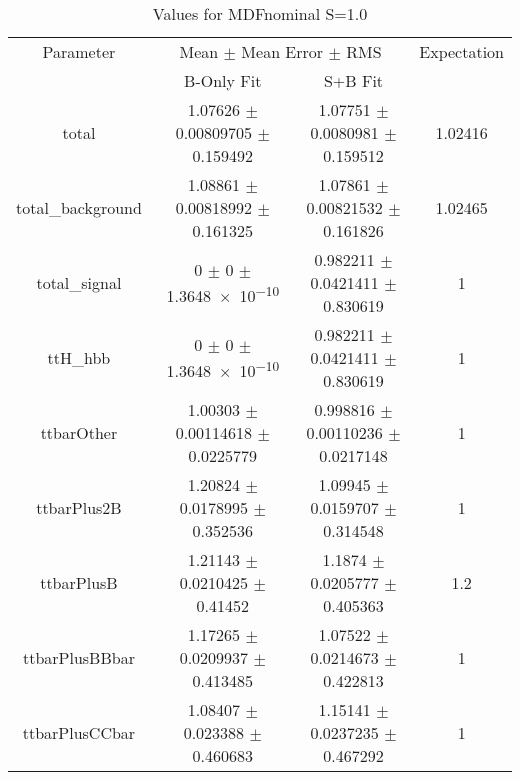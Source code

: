 \begin{table}
\centering
\caption{Values for MDFnominal S=1.0}
\begin{tabular}{cccc}
\toprule
Parameter & \multicolumn{2}{c}{Mean $\pm$ Mean Error $\pm$ RMS} & Expectation\\
 & B-Only Fit & S+B Fit & \\
\midrule
total & \num{1.07626} $\pm$ \num{0.00809705} $\pm$ \num{0.159492} & \num{1.07751} $\pm$ \num{0.0080981} $\pm$ \num{0.159512} & \num{1.02416}\\
total\_background & \num{1.08861} $\pm$ \num{0.00818992} $\pm$ \num{0.161325} & \num{1.07861} $\pm$ \num{0.00821532} $\pm$ \num{0.161826} & \num{1.02465}\\
total\_signal & \num{0} $\pm$ \num{0} $\pm$ \num{1.3648e-10} & \num{0.982211} $\pm$ \num{0.0421411} $\pm$ \num{0.830619} & \num{1}\\
ttH\_hbb & \num{0} $\pm$ \num{0} $\pm$ \num{1.3648e-10} & \num{0.982211} $\pm$ \num{0.0421411} $\pm$ \num{0.830619} & \num{1}\\
ttbarOther & \num{1.00303} $\pm$ \num{0.00114618} $\pm$ \num{0.0225779} & \num{0.998816} $\pm$ \num{0.00110236} $\pm$ \num{0.0217148} & \num{1}\\
ttbarPlus2B & \num{1.20824} $\pm$ \num{0.0178995} $\pm$ \num{0.352536} & \num{1.09945} $\pm$ \num{0.0159707} $\pm$ \num{0.314548} & \num{1}\\
ttbarPlusB & \num{1.21143} $\pm$ \num{0.0210425} $\pm$ \num{0.41452} & \num{1.1874} $\pm$ \num{0.0205777} $\pm$ \num{0.405363} & \num{1.2}\\
ttbarPlusBBbar & \num{1.17265} $\pm$ \num{0.0209937} $\pm$ \num{0.413485} & \num{1.07522} $\pm$ \num{0.0214673} $\pm$ \num{0.422813} & \num{1}\\
ttbarPlusCCbar & \num{1.08407} $\pm$ \num{0.023388} $\pm$ \num{0.460683} & \num{1.15141} $\pm$ \num{0.0237235} $\pm$ \num{0.467292} & \num{1}\\
\bottomrule
\end{tabular}
\end{table}